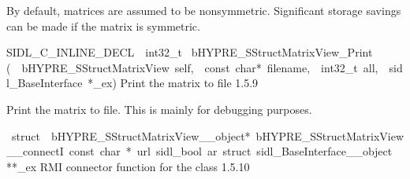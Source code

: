 \documentclass{article}
\begin{document}
\begin{cxxentry}
\begin{cxxentry}
\begin{cxxfunction}
\begin{cxxdoc}
By default, matrices are assumed to be nonsymmetric.
Significant storage savings can be made if the matrix is
symmetric.
\end{cxxdoc}
\end{cxxfunction}
\begin{cxxfunction}
{SIDL\_C\_INLINE\_DECL\ \ int32\_t\ }
        {bHYPRE\_SStructMatrixView\_Print}
        {(\ \ bHYPRE\_SStructMatrixView\ self,\ \ const\ char*\ filename,\ \ int32\_t\ all,\ \ sidl\_BaseInterface\ *\_ex)}
        {
Print the matrix to file}
        {1.5.9}
\begin{cxxdoc}

Print the matrix to file.  This is mainly for debugging
purposes.
\end{cxxdoc}
\end{cxxfunction}
\begin{cxxvariable}
{\ struct\ \ bHYPRE\_SStructMatrixView\_\_object*\ bHYPRE\_SStructMatrixView\_\_connectI\ const\ char\ *\ url\ sidl\_bool\ ar\ struct\ sidl\_BaseInterface\_\_object}
        {**\_ex}
        {}
        {
RMI connector function for the class}
        {1.5.10}
\begin{cxxdoc}


\end{cxxdoc}
\end{cxxvariable}
\end{cxxentry}
\end{cxxentry}
\end{document}

